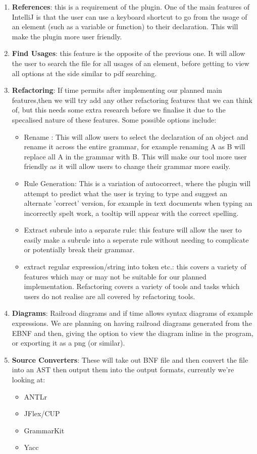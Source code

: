 \begin{enumerate}
	\item \textbf{References}: this is a requirement of the plugin. One of the main features of IntelliJ is that the user can use a keyboard shortcut to go from the usage of an element (such as a variable or function) to their declaration. This will make the plugin more user friendly.
	\item \textbf{Find Usages}: this feature is the opposite of the previous one. It will allow the user to search the file for all usages of an element, before getting to view all options at the side similar to pdf searching.
	\item \textbf{Refactoring}: If time permits after implementing our planned main features,then we will try add any other refactoring features that we can think of, but this needs some extra research before we finalise it due to the specalised nature of these features. Some possible options include:
	      \begin{itemize}
		    \item Rename : This will allow users to select the declaration of an object and rename it across the entire grammar, for example renaming A as B will replace all A in the grammar with B. This will make our tool more user friendly as it will allow users to change their grammar more easily. 
		    \item Rule Generation: This is a variation of autocorrect, where the plugin will attempt to predict what the user is trying to type and suggest an alternate 'correct' version, for example in text documents when typing an incorrectly spelt work, a tooltip will appear with the correct spelling.
		    \item Extract subrule into a separate rule: this feature will allow the user to easily make a subrule into a seperate rule without needing to complicate or potentially break their grammar. 
		    \item extract regular expression/string into token etc.: this covers a variety of features which may or may not be suitable for our planned implementation. Refactoring covers a variety of tools and tasks which users do not realise are all covered by refactoring tools.
	      \end{itemize}
	\item \textbf{Diagrams}: Railroad diagrams and if time allows syntax diagrams of example expressions. We are planning on having railroad diagrams generated from the EBNF and then, giving the option to view the diagram inline in the program, or exporting it as a png (or similar). 
	\item \textbf{Source Converters}: These will take out BNF file and then convert the file into an AST then output them into the output formats, currently we're looking at:
	      \begin{itemize}
		    \item ANTLr
		    \item JFlex/CUP
		    \item GrammarKit
		    \item Yacc
	      \end{itemize}
	      

\end{enumerate}

